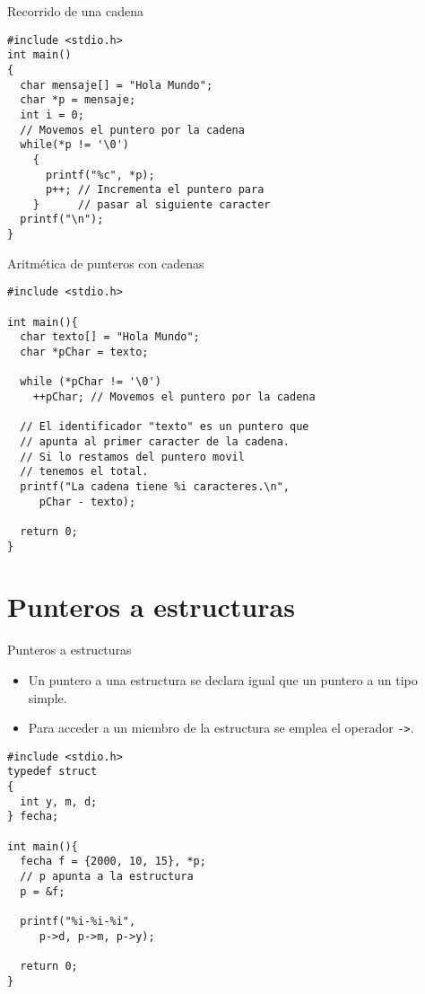 \documentclass[xcolor={usenames,svgnames,dvipsnames}, aspectratio=169]{beamer}
\begin{document}
\begin{frame}[label={sec:orgf2063e0},fragile]{Recorrido de una cadena}
 \lstset{language=C,label= ,caption= ,captionpos=b,numbers=none}
\begin{lstlisting}
#include <stdio.h>
int main()
{
  char mensaje[] = "Hola Mundo";
  char *p = mensaje;
  int i = 0;
  // Movemos el puntero por la cadena
  while(*p != '\0')
    {
      printf("%c", *p);
      p++; // Incrementa el puntero para 
    }      // pasar al siguiente caracter
  printf("\n");
}
\end{lstlisting}
\end{frame}

\begin{frame}[label={sec:org6e29f03},fragile]{Aritmética de punteros con cadenas}
 \lstset{language=C,label= ,caption= ,captionpos=b,numbers=none}
\begin{lstlisting}
#include <stdio.h>

int main(){
  char texto[] = "Hola Mundo";
  char *pChar = texto;

  while (*pChar != '\0')
    ++pChar; // Movemos el puntero por la cadena

  // El identificador "texto" es un puntero que
  // apunta al primer caracter de la cadena.
  // Si lo restamos del puntero movil
  // tenemos el total.
  printf("La cadena tiene %i caracteres.\n",
	 pChar - texto);

  return 0;
}
\end{lstlisting}
\end{frame}

\section{Punteros a estructuras}
\label{sec:orgdfd423d}

\begin{frame}[label={sec:orgca53829},fragile,plain]{Punteros a estructuras}
 \begin{itemize}
\item Un puntero a una estructura se declara igual que un puntero a un tipo simple.
\item Para acceder a un miembro de la estructura se emplea el operador \texttt{->}.
\end{itemize}
\lstset{language=C,label= ,caption= ,captionpos=b,numbers=none}
\begin{lstlisting}
#include <stdio.h>
typedef struct 
{
  int y, m, d;
} fecha;

int main(){
  fecha f = {2000, 10, 15}, *p;
  // p apunta a la estructura
  p = &f;

  printf("%i-%i-%i",
	 p->d, p->m, p->y);

  return 0;
}
\end{lstlisting}
\end{frame}
\end{document}
